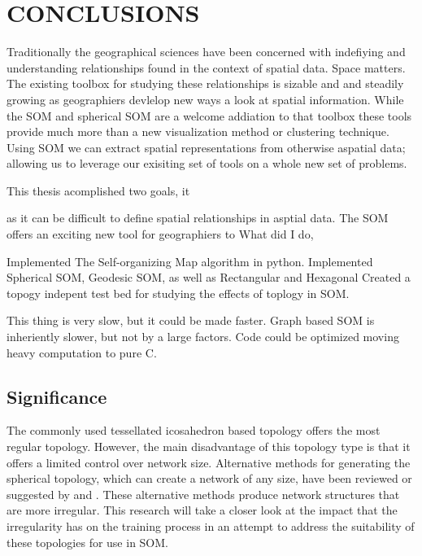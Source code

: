 \chapter{CONCLUSIONS}
Traditionally the geographical sciences have been concerned with indefiying and
understanding relationships found in the context of spatial data.  Space
matters. The existing toolbox for studying these relationships is sizable and
and steadily growing as geographiers devlelop new ways a look at spatial
information.  While the SOM and spherical SOM are a welcome addiation to that
toolbox these tools provide much more than a new visualization method or
clustering technique.  Using SOM we can extract spatial representations from
otherwise aspatial data; allowing us to leverage our exisiting set of
tools on a whole new set of problems.

This thesis acomplished two goals, it 



as it can be difficult to define spatial relationships in asptial data.  The
SOM offers an exciting new tool for geographiers to 
What did I do,

Implemented The Self-organizing Map algorithm in python.
Implemented Spherical SOM, Geodesic SOM, as well as Rectangular and Hexagonal
Created a topogy indepent test bed for studying the effects of toplogy in SOM.

This thing is very slow, but it could be made faster.
Graph based SOM is inheriently slower, but not by a large factors.
Code could be optimized moving heavy computation to pure C.







\section{Significance}
The commonly used tessellated icosahedron based topology offers the most
regular topology.   However, the main disadvantage of this topology type is that it
offers a limited control over network size.  Alternative methods for generating
the spherical topology, which can create a network of any size, have been
reviewed or suggested by \cite{wu2005} and \cite{Nishio:2006fk}.  These
alternative methods produce network structures that are more irregular.  This
research will take a closer look at the impact that the irregularity has on the
training process in an attempt to address the suitability of these topologies
for use in SOM.

